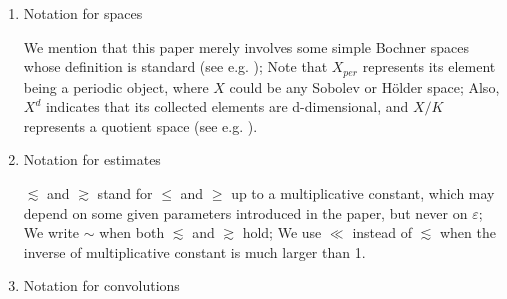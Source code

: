 \documentclass[13pt,CJK]{article}
\theoremstyle{plain}                       %
\theoremstyle{remark}
\numberwithin{equation}{section}
\begin{document}
\begin{enumerate}
\item Notation for spaces

We mention that this paper merely involves some simple Bochner spaces whose definition
is standard (see e.g. \cite[Subsection 5.9.2]{Evans10}); Note that $X_{per}$ represents its element being a periodic object,
where $X$ could be any Sobolev or H\"older space;
Also, $X^d$ indicates that its collected elements are d-dimensional, and $X/K$ represents a quotient space (see e.g. \cite{Chechkin-Piatnitski-Shamaev2007,Shen18}).

\item Notation for estimates

$\lesssim$ and $\gtrsim$ stand for $\leq$ and $\geq$ up to a multiplicative constant, which may depend on some given parameters introduced in the paper, but never on $\varepsilon$;  We write $\sim$ when both $\lesssim$ and $\gtrsim$ hold; We use $\ll$ instead of
$\lesssim$ when the inverse of multiplicative constant
is much larger than 1.



\item Notation for convolutions


\end{enumerate}
\end{document}

